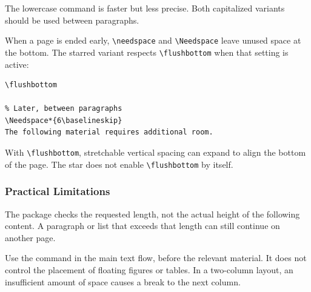 The lowercase command is faster but less precise.
Both capitalized variants should be used between paragraphs.

When a page is ended early, \verb|\needspace| and
\verb|\Needspace| leave unused space at the bottom.
The starred variant respects \verb|\flushbottom| when
that setting is active:

\begin{lstlisting}[style=latex]
% Document setting
\flushbottom

% Later, between paragraphs
\Needspace*{6\baselineskip}
The following material requires additional room.
\end{lstlisting}

With \verb|\flushbottom|, stretchable vertical spacing can
expand to align the bottom of the page. The star does not
enable \verb|\flushbottom| by itself.

\subsubsection{Practical Limitations}

The package checks the requested length, not the actual
height of the following content. A paragraph or list that
exceeds that length can still continue on another page.

Use the command in the main text flow, before the relevant
material. It does not control the placement of floating
figures or tables. In a two-column layout, an insufficient
amount of space causes a break to the next column.